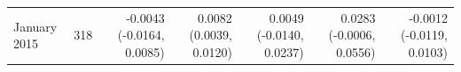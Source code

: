 \begin{tabular}{lrrrrrr}
January 2015 & 318 & -0.0043 (-0.0164, 0.0085) & 0.0082 (0.0039, 0.0120) & 0.0049 (-0.0140, 0.0237) & 0.0283 (-0.0006, 0.0556) & -0.0012 (-0.0119, 0.0103) \\

\end{tabular}

